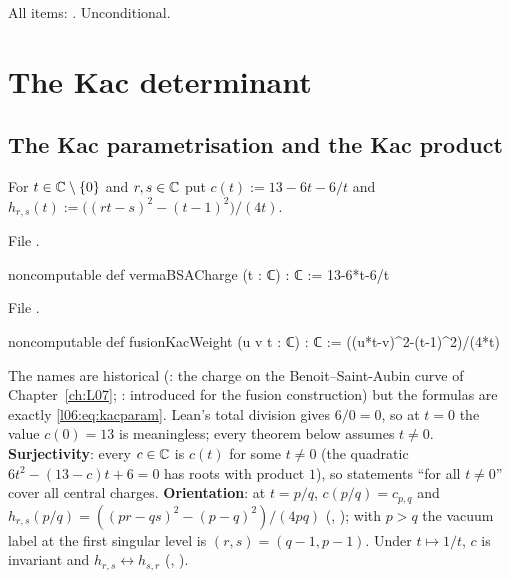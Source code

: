 \begin{status}
All items: \lean{[propext, Classical.}\allowbreak{}\allowbreak\lean{sound]}. Unconditional.
\end{status}

\section{The Kac determinant}\label{l06:sec:kac}

\subsection{The Kac parametrisation and the Kac product}

\begin{definition}\label{l06:def:kacparam}
For $t\in{\mathbb{C}}\setminus\{0\}$ and $r,s\in{\mathbb{C}}$ put $c(t) := 13-6t-6/t$ and
$h_{r,s}(t) := \bigl((rt-s)^2-(t-1)^2\bigr)/(4t)$.
\end{definition}

File .
\begin{leancode}
noncomputable def vermaBSACharge (t : ℂ) : ℂ := 13-6*t-6/t
\end{leancode}
File .
\begin{leancode}
noncomputable def fusionKacWeight (u v t : ℂ) : ℂ :=
  ((u*t-v)^2-(t-1)^2)/(4*t)
\end{leancode}

\begin{dictionary}
The names are historical (: the charge on the Benoit--Saint-Aubin curve of
Chapter~\ref{ch:L07}; : introduced for the fusion construction) but the formulas are
exactly \eqref{l06:eq:kacparam}. Lean's total division gives $6/0 = 0$, so at $t = 0$ the value $c(0) = 13$
is meaningless; every theorem below assumes $t\ne0$. \textbf{Surjectivity}: every $c\in{\mathbb{C}}$ is $c(t)$ for
some $t\ne0$ (the quadratic $6t^2-(13-c)t+6 = 0$ has roots with product $1$), so statements ``for all
$t\ne0$'' cover all central charges. \textbf{Orientation}: at $t = p/q$, $c(p/q) = c_{p,q}$ and
$h_{r,s}(p/q) = ((pr-qs)^2-(p-q)^2)/(4pq)$ (\allowbreak{},
); with $p>q$ the vacuum label at the first singular level is $(r,s) = (q-1,p-1)$.
Under $t\mapsto1/t$, $c$ is invariant and $h_{r,s}\leftrightarrow h_{s,r}$ (,
\allowbreak{}\allowbreak{}).
\end{dictionary}

